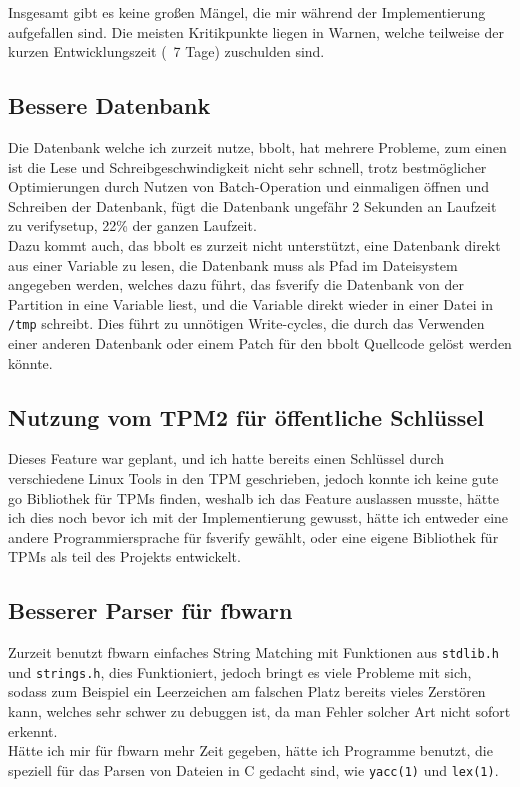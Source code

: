 Insgesamt gibt es keine großen Mängel, die mir während der Implementierung aufgefallen sind. Die meisten Kritikpunkte liegen in Warnen, welche teilweise der kurzen Entwicklungszeit (~7 Tage) zuschulden sind.

\subsection{Bessere Datenbank}
Die Datenbank welche ich zurzeit nutze, bbolt, hat mehrere Probleme, zum einen ist die Lese und Schreibgeschwindigkeit nicht sehr schnell, trotz bestmöglicher Optimierungen durch Nutzen von Batch-Operation und einmaligen öffnen und Schreiben der Datenbank, fügt die Datenbank ungefähr 2 Sekunden an Laufzeit zu verifysetup, 22\% der ganzen Laufzeit.\\
Dazu kommt auch, das bbolt es zurzeit nicht unterstützt, eine Datenbank direkt aus einer Variable zu lesen, die Datenbank muss als Pfad im Dateisystem angegeben werden, welches dazu führt, das fsverify die Datenbank von der Partition in eine Variable liest, und die Variable direkt wieder in einer Datei in \texttt{/tmp} schreibt. Dies führt zu unnötigen Write-cycles, die durch das Verwenden einer anderen Datenbank oder einem Patch für den bbolt Quellcode gelöst werden könnte.

\subsection{Nutzung vom TPM2 für öffentliche Schlüssel}
Dieses Feature war geplant, und ich hatte bereits einen Schlüssel durch verschiedene Linux Tools in den TPM geschrieben, jedoch konnte ich keine gute go Bibliothek für TPMs finden, weshalb ich das Feature auslassen musste, hätte ich dies noch bevor ich mit der Implementierung gewusst, hätte ich entweder eine andere Programmiersprache für fsverify gewählt, oder eine eigene Bibliothek für TPMs als teil des Projekts entwickelt.

\subsection{Besserer Parser für fbwarn}
Zurzeit benutzt fbwarn einfaches String Matching mit Funktionen aus \texttt{stdlib.h} und \texttt{strings.h}, dies Funktioniert, jedoch bringt es viele Probleme mit sich, sodass zum Beispiel ein Leerzeichen am falschen Platz bereits vieles Zerstören kann, welches sehr schwer zu debuggen ist, da man Fehler solcher Art nicht sofort erkennt.\\
Hätte ich mir für fbwarn mehr Zeit gegeben, hätte ich Programme benutzt, die speziell für das Parsen von Dateien in C gedacht sind, wie \texttt{yacc(1)} und \texttt{lex(1)}.

